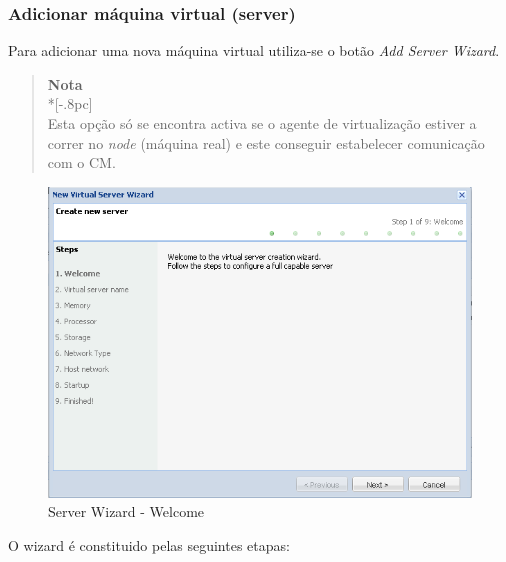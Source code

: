 \subsubsection{Adicionar máquina virtual (server)}
\label{sec:add_server}

Para adicionar uma nova máquina virtual utiliza-se o botão \emph{Add Server Wizard}.
\begin{quote}
	{\large \bf Nota} \\*[-.8pc]
	\underline{\hspace{6in}} \\
	Esta opção só se encontra activa se o agente de virtualização estiver a correr no \emph{node} (máquina real) e este conseguir estabelecer comunicação com o CM.
\end{quote}
 

\begin{figure}[H]
	\begin{center}
	\includegraphics[scale=0.5]{screenshots/server_createwiz.png}
	\caption{Server Wizard - Welcome}
	\label{fig:server_createwiz}
	\end{center}
\end{figure}
O wizard é constituido pelas seguintes etapas:
